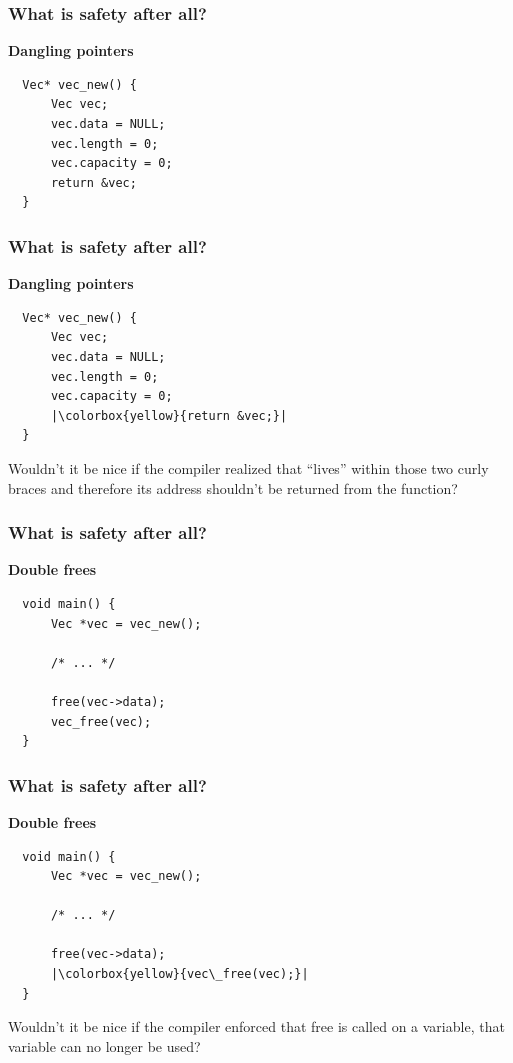\documentclass[aspectratio=1610,t]{beamer}
\begin{document}

\begin{frame}[fragile]
\frametitle{What is safety after all?}
\textbf{Dangling pointers}

\begin{verbatim}
  Vec* vec_new() {
      Vec vec;
      vec.data = NULL;
      vec.length = 0;
      vec.capacity = 0;
      return &vec;
  }
\end{verbatim}

\end{frame}


\begin{frame}[fragile]
\frametitle{What is safety after all?}
\textbf{Dangling pointers}

\begin{verbatim}
  Vec* vec_new() {
      Vec vec;
      vec.data = NULL;
      vec.length = 0;
      vec.capacity = 0;
      |\colorbox{yellow}{return &vec;}|
  }
\end{verbatim}

Wouldn’t it be nice if the compiler realized that  “lives” within those two curly braces and therefore its address shouldn’t be returned from the function?

\end{frame}


\begin{frame}[fragile]
\frametitle{What is safety after all?}
\textbf{Double frees}

\begin{verbatim}
  void main() {
      Vec *vec = vec_new();

      /* ... */

      free(vec->data);
      vec_free(vec);
  }
\end{verbatim}

\end{frame}


\begin{frame}[fragile]
\frametitle{What is safety after all?}
\textbf{Double frees}

\begin{verbatim}
  void main() {
      Vec *vec = vec_new();

      /* ... */

      free(vec->data);
      |\colorbox{yellow}{vec\_free(vec);}|
  }
\end{verbatim}

Wouldn’t it be nice if the compiler enforced that free is called on a variable, that variable can no longer be used?

\end{frame}
\end{document}
